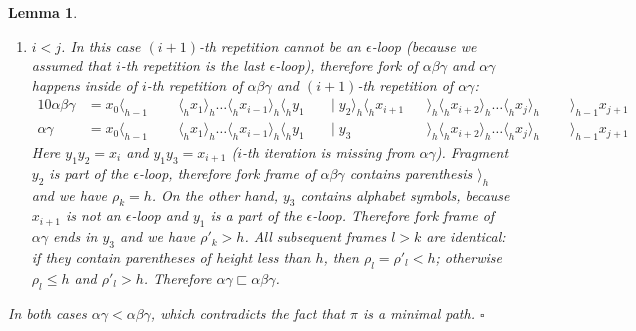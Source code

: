 \documentclass[AMA,STIX1COL]{WileyNJD-v2}
\newcommand{\Xl}{\langle}
\newcommand{\Xr}{\rangle}
\newtheorem{XLem}{Lemma}
\begin{document}
\begin{XLem}
\begin{enumerate}[itemsep=0.5em]
    \item[(2)]
    $i < j$.
    In this case $(i + 1)$-th repetition cannot be an $\epsilon$-loop
    (because we assumed that $i$-th repetition is the \emph{last} $\epsilon$-loop),
    therefore
    fork of $\alpha \beta \gamma$ and $\alpha \gamma$ happens
    inside of $i$-th repetition of $\alpha \beta \gamma$
    and $(i + 1)$-th repetition of $\alpha \gamma$:
    \begin{alignat*}{10}
        \alpha \beta \gamma &= x_0 \Xl_{h-1} \;&&\; \Xl_h x_1 \Xr_h \hdots \Xl_h x_{i-1} \Xr_h \Xl_h y_1 \;&&\big|\; y_2 \Xr_h \Xl_h x_{i+1} && \Xr_h \Xl_h x_{i+2} \Xr_h \hdots \Xl_h x_j \Xr_h \;&&\; \Xr_{h-1} x_{j+1} \\[-0.5em]
        \alpha \gamma       &= x_0 \Xl_{h-1} \;&&\; \Xl_h x_1 \Xr_h \hdots \Xl_h x_{i-1} \Xr_h \Xl_h y_1 \;&&\big|\; y_3                     && \Xr_h \Xl_h x_{i+2} \Xr_h \hdots \Xl_h x_j \Xr_h \;&&\; \Xr_{h-1} x_{j+1}
    \end{alignat*}
    Here $y_1 y_2 = x_i$ and $y_1 y_3 = x_{i+1}$ ($i$-th iteration is missing from $\alpha \gamma$).
    Fragment $y_2$ is part of the $\epsilon$-loop,
    therefore fork frame of $\alpha \beta \gamma$ contains parenthesis $\Xr_h$ and we have $\rho_k = h$.
    On the other hand, $y_3$ contains alphabet symbols,
    because $x_{i+1}$ is not an $\epsilon$-loop and $y_1$ is a part of the $\epsilon$-loop.
    Therefore fork frame of $\alpha \gamma$ ends in $y_3$ and we have $\rho'_k > h$.
    All subsequent frames $l > k$ are identical:
    if they contain parentheses of height less than $h$, then $\rho_l = \rho'_l < h$;
    otherwise $\rho_l \leq h$ and $\rho'_l > h$.
    Therefore $\alpha \gamma \sqsubset \alpha \beta \gamma$.

    \end{enumerate}

    In both cases $\alpha \gamma < \alpha \beta \gamma$,
    which contradicts the fact that $\pi$ is a minimal path.
    $\square$

\end{XLem}
\end{document}
